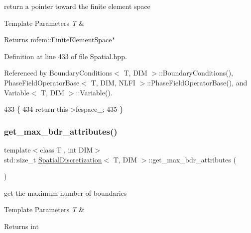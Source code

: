 return a pointer toward the finite element space 


\begin{DoxyTemplParams}{Template Parameters}
{\em T} & \\
\hline
\end{DoxyTemplParams}
\begin{DoxyReturn}{Returns}
mfem\+::\+Finite\+Element\+Space$\ast$ 
\end{DoxyReturn}


Definition at line 433 of file Spatial.\+hpp.



Referenced by Boundary\+Conditions$<$ T, D\+I\+M $>$\+::\+Boundary\+Conditions(), Phase\+Field\+Operator\+Base$<$ T, D\+I\+M, N\+L\+F\+I $>$\+::\+Phase\+Field\+Operator\+Base(), and Variable$<$ T, D\+I\+M $>$\+::\+Variable().


\begin{DoxyCode}
433                                                                                 \{
434   \textcolor{keywordflow}{return} this->fespace\_;
435 \}
\end{DoxyCode}
\mbox{\label{classSpatialDiscretization_aa6fe6ae45f18daf5a20fbc8b49b2ef05}} 
\subsubsection{\texorpdfstring{get\+\_\+max\+\_\+bdr\+\_\+attributes()}{get\_max\_bdr\_attributes()}}
{\footnotesize\ttfamily template$<$class T , int D\+IM$>$ \\
std\+::size\+\_\+t \hyperlink{classSpatialDiscretization}{Spatial\+Discretization}$<$ T, D\+IM $>$\+::get\+\_\+max\+\_\+bdr\+\_\+attributes (\begin{DoxyParamCaption}{ }\end{DoxyParamCaption})}



get the maximum number of boundaries 


\begin{DoxyTemplParams}{Template Parameters}
{\em T} & \\
\hline
\end{DoxyTemplParams}
\begin{DoxyReturn}{Returns}
int 
\end{DoxyReturn}


